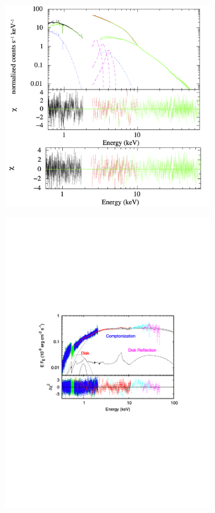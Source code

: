 \documentclass[graybox]{svmult}
\begin{document}
\begin{figure}
\begin{subfigure}{.5\textwidth}
  \centering
  \includegraphics[angle=-90,width=1\linewidth]{REVIEW_AMXP/1808_spec2.png}
  \label{fig:sfig1}
\end{subfigure}%
\begin{subfigure}{.5\textwidth}
  \centering
  \includegraphics[width=1.3\linewidth]{REVIEW_AMXP/hete_spec}

\end{subfigure}
\end{figure}
\end{document}
